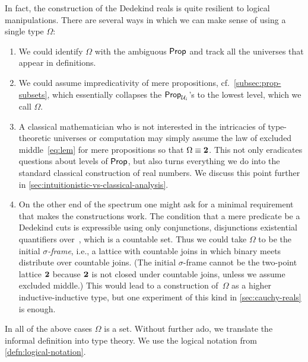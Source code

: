 In fact, the construction of the Dedekind reals is quite resilient to logical
manipulations. There are several ways in which we can make sense of using a single type
$\Omega$:
%
\begin{enumerate}

\item We could identify $\Omega$ with the ambiguous $\mathsf{Prop}$ and track all the universes
  that appear in definitions.

\item We could assume impredicativity of mere propositions, cf.\
  \ref{subsec:prop-subsets}, which essentially collapses the $\mathsf{Prop}_{\mathcal{U}_i}$'s to the
  lowest level, which we call $\Omega$.

\item A classical mathematician who is not interested in the intricacies of type-theoretic
  universes or computation may simply assume the law of excluded middle~\eqref{eq:lem} for
  mere propositions so that $\Omega \equiv \mathbf{2}$. This not only eradicates questions about
  levels of $\mathsf{Prop}$, but also turns everything we do into the standard classical
  construction of real numbers. We discuss this point further in
  \autoref{sec:intuitionistic-vs-classical-analysis}.

\item On the other end of the spectrum one might ask for a minimal requirement that makes
  the constructions work. The condition that a mere predicate be a Dedekind cuts is
  expressible using only conjunctions, disjunctions existential quantifiers over~\Q, which
  is a countable set. Thus we could take $\Omega$ to be the initial \emph{$\sigma$-frame},
  i.e., a lattice with countable joins in which binary meets distribute over countable
  joins. (The initial $\sigma$-frame cannot be the two-point lattice $\mathbf{2}$ because
  $\mathbf{2}$ is not closed under countable joins, unless we assume excluded middle.) This
  would lead to a construction of~$\Omega$ as a higher inductive-inductive type, but one
  experiment of this kind in \autoref{sec:cauchy-reals} is enough.
\end{enumerate}

In all of the above cases $\Omega$ is a set.
%
Without further ado, we translate the informal definition into type theory. We use the
logical notation from \autoref{defn:logical-notation}.

